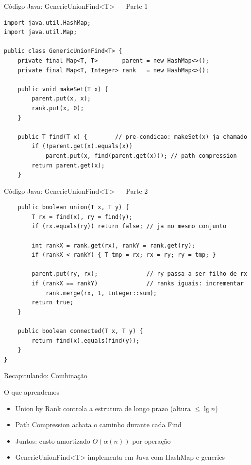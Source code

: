 \documentclass[aspectratio=169]{beamer}
\begin{document}
\begin{frame}[fragile,shrink=5]{Código Java: GenericUnionFind\textless T\textgreater{} — Parte 1}%
\begin{lstlisting}
import java.util.HashMap;
import java.util.Map;

public class GenericUnionFind<T> {
    private final Map<T, T>       parent = new HashMap<>();
    private final Map<T, Integer> rank   = new HashMap<>();

    public void makeSet(T x) {
        parent.put(x, x);
        rank.put(x, 0);
    }

    public T find(T x) {        // pre-condicao: makeSet(x) ja chamado
        if (!parent.get(x).equals(x))
            parent.put(x, find(parent.get(x))); // path compression
        return parent.get(x);
    }
\end{lstlisting}
\end{frame}

\begin{frame}[fragile,shrink=5]{Código Java: GenericUnionFind\textless T\textgreater{} — Parte 2}%
\begin{lstlisting}
    public boolean union(T x, T y) {
        T rx = find(x), ry = find(y);
        if (rx.equals(ry)) return false; // ja no mesmo conjunto

        int rankX = rank.get(rx), rankY = rank.get(ry);
        if (rankX < rankY) { T tmp = rx; rx = ry; ry = tmp; }

        parent.put(ry, rx);              // ry passa a ser filho de rx
        if (rankX == rankY)              // ranks iguais: incrementar
            rank.merge(rx, 1, Integer::sum);
        return true;
    }

    public boolean connected(T x, T y) {
        return find(x).equals(find(y));
    }
}
\end{lstlisting}
\end{frame}

\begin{frame}{Recapitulando: Combinação}%
  \begin{block}{O que aprendemos}
    \begin{itemize}
      \item Union by Rank controla a estrutura de longo prazo (altura $\leq \lg n$)
      \item Path Compression achata o caminho durante cada Find
      \item Juntos: custo amortizado $O(\alpha(n))$ por operação
      \item GenericUnionFind<T> implementa em Java com HashMap e generics
    \end{itemize}
  \end{block}
\end{frame}
\end{document}
